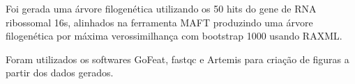 Foi gerada uma árvore filogenética utilizando os 50 hits do gene de RNA ribossomal 16s, alinhados
na ferramenta MAFT produzindo uma árvore filogenética por máxima verossimilhança com bootstrap 1000 usando RAXML.

Foram utilizados os softwares GoFeat, fastqc e Artemis para criação de figuras a partir dos dados gerados.
